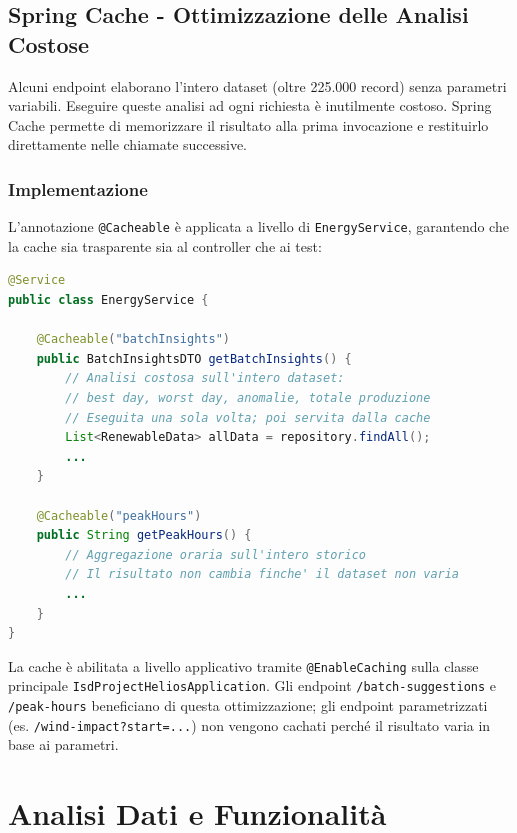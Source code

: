 \documentclass[a4paper,12pt]{report}
\begin{document}
\section{Spring Cache - Ottimizzazione delle Analisi Costose}

Alcuni endpoint elaborano l'intero dataset (oltre 225.000 record) senza parametri variabili. Eseguire queste analisi ad ogni richiesta è inutilmente costoso. Spring Cache permette di memorizzare il risultato alla prima invocazione e restituirlo direttamente nelle chiamate successive.

\subsection{Implementazione}
L'annotazione \texttt{@Cacheable} è applicata a livello di \texttt{EnergyService}, garantendo che la cache sia trasparente sia al controller che ai test:

\begin{lstlisting}[language=Java, caption=Spring Cache su EnergyService]
@Service
public class EnergyService {

    @Cacheable("batchInsights")
    public BatchInsightsDTO getBatchInsights() {
        // Analisi costosa sull'intero dataset:
        // best day, worst day, anomalie, totale produzione
        // Eseguita una sola volta; poi servita dalla cache
        List<RenewableData> allData = repository.findAll();
        ...
    }

    @Cacheable("peakHours")
    public String getPeakHours() {
        // Aggregazione oraria sull'intero storico
        // Il risultato non cambia finche' il dataset non varia
        ...
    }
}
\end{lstlisting}

La cache è abilitata a livello applicativo tramite \texttt{@EnableCaching} sulla classe principale \texttt{IsdProjectHeliosApplication}. Gli endpoint \texttt{/batch-suggestions} e \texttt{/peak-hours} beneficiano di questa ottimizzazione; gli endpoint parametrizzati (es. \texttt{/wind-impact?start=...}) non vengono cachati perché il risultato varia in base ai parametri.

\chapter{Analisi Dati e Funzionalità}
\end{document}

